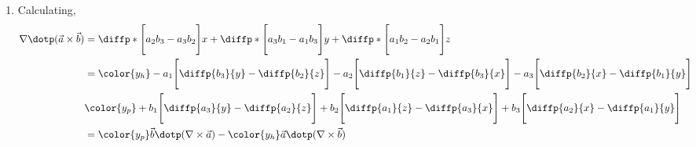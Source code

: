 \begin{enumerate}
\begin{enumerate}
              \item Calculating,
                    \begin{align}
                        \nabla \dotp (\vec{a} \times \vec{b}) & =
                        \diffp*{\Bigg[ a_2 b_3 - a_3 b_2 \Bigg]}{x}
                        + \diffp*{\Bigg[ a_3 b_1 - a_1 b_3 \Bigg]}{y}
                        + \diffp*{\Bigg[ a_1 b_2 - a_2 b_1 \Bigg]}{z}         \\
                                                              & = \color{y_h}
                        - a_1 \Bigg[ \diffp{b_3}{y} - \diffp{b_2}{z} \Bigg]
                        - a_2 \Bigg[ \diffp{b_1}{z} - \diffp{b_3}{x} \Bigg]
                        - a_3 \Bigg[ \diffp{b_2}{x} - \diffp{b_1}{y} \Bigg]   \\
                                                              & \color{y_p}
                        + b_1 \Bigg[ \diffp{a_3}{y} - \diffp{a_2}{z} \Bigg]
                        + b_2 \Bigg[ \diffp{a_1}{z} - \diffp{a_3}{x} \Bigg]
                        + b_3 \Bigg[ \diffp{a_2}{x} - \diffp{a_1}{y} \Bigg]   \\
                                                              & =
                        {\color{y_p}\vec{b} \dotp (\nabla \times \vec{a})} -
                        {\color{y_h}\vec{a} \dotp (\nabla \times \vec{b})}
                    \end{align}
          \end{enumerate}


\end{enumerate}
